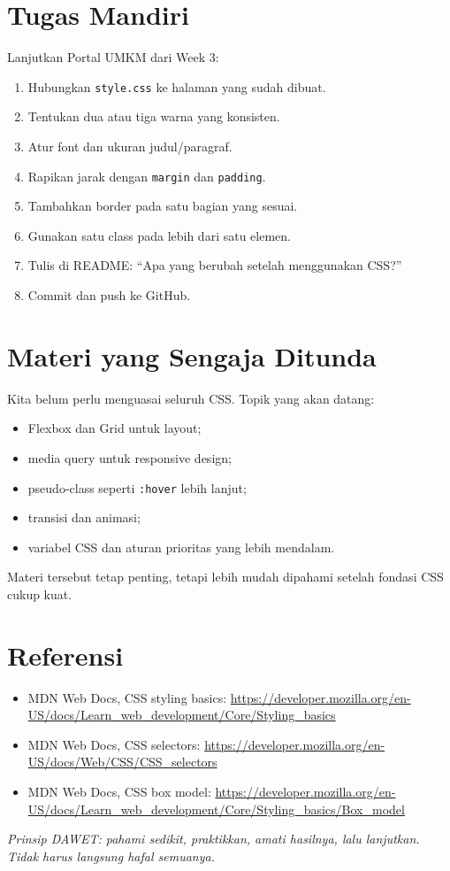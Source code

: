 \documentclass[11pt,a4paper]{article}
\begin{document}
\section{Tugas Mandiri}
Lanjutkan Portal UMKM dari Week 3:
\begin{enumerate}[leftmargin=*]
\item Hubungkan \texttt{style.css} ke halaman yang sudah dibuat.
\item Tentukan dua atau tiga warna yang konsisten.
\item Atur font dan ukuran judul/paragraf.
\item Rapikan jarak dengan \texttt{margin} dan \texttt{padding}.
\item Tambahkan border pada satu bagian yang sesuai.
\item Gunakan satu class pada lebih dari satu elemen.
\item Tulis di README: ``Apa yang berubah setelah menggunakan CSS?''
\item Commit dan push ke GitHub.
\end{enumerate}

\section{Materi yang Sengaja Ditunda}
Kita belum perlu menguasai seluruh CSS. Topik yang akan datang:
\begin{itemize}[leftmargin=*]
\item Flexbox dan Grid untuk layout;
\item media query untuk responsive design;
\item pseudo-class seperti \texttt{:hover} lebih lanjut;
\item transisi dan animasi;
\item variabel CSS dan aturan prioritas yang lebih mendalam.
\end{itemize}
Materi tersebut tetap penting, tetapi lebih mudah dipahami setelah fondasi CSS cukup kuat.

\section{Referensi}
\begin{itemize}[leftmargin=*]
\item MDN Web Docs, CSS styling basics: \url{https://developer.mozilla.org/en-US/docs/Learn_web_development/Core/Styling_basics}
\item MDN Web Docs, CSS selectors: \url{https://developer.mozilla.org/en-US/docs/Web/CSS/CSS_selectors}
\item MDN Web Docs, CSS box model: \url{https://developer.mozilla.org/en-US/docs/Learn_web_development/Core/Styling_basics/Box_model}
\end{itemize}
\begin{center}
\textit{Prinsip DAWET: pahami sedikit, praktikkan, amati hasilnya, lalu lanjutkan. Tidak harus langsung hafal semuanya.}
\end{center}
\end{document}
